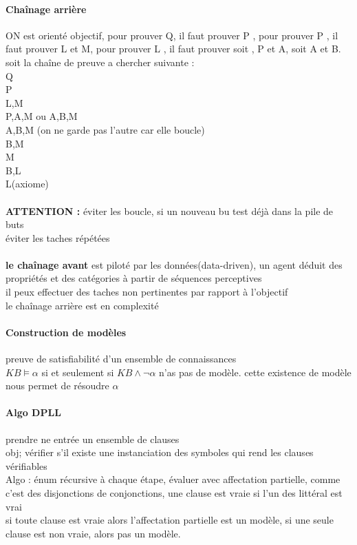 \documentclass{article}
\begin{document}
\paragraph{Chaînage arrière} ON est orienté objectif, pour prouver Q, il faut prouver P , pour prouver P , il faut prouver L et M, pour prouver L , il faut prouver soit , P et A, soit A et B. soit la chaîne de preuve a chercher suivante :\\
Q\\P\\L,M\\P,A,M ou A,B,M\\A,B,M (on ne garde pas l'autre car elle boucle)\\B,M\\M\\B,L\\L(axiome)\\\\ \textbf{ATTENTION : }éviter les boucle, si un nouveau bu test déjà dans la pile de buts \\ éviter les taches répétées\\\\
\textbf{le chaînage avant} est piloté par les données(data-driven), un agent déduit des propriétés et des catégories à partir de séquences perceptives\\il peux effectuer des taches non pertinentes par rapport à l'objectif\\le chaînage arrière est en complexité
\paragraph{Construction de modèles} preuve de satisfiabilité d'un ensemble de connaissances\\$KB\models \alpha$ si et seulement si $KB \wedge \neg \alpha$ n'as pas de modèle. cette existence de modèle nous permet de résoudre $\alpha$\\
\paragraph{Algo DPLL} prendre ne entrée un ensemble de clauses\\obj;  vérifier s'il existe une instanciation des symboles qui rend les clauses vérifiables\\Algo : énum récursive à chaque étape, évaluer avec affectation partielle, comme c'est des disjonctions de conjonctions, une clause est vraie si l'un des littéral est vrai\\si toute clause est vraie alors l'affectation partielle est un modèle, si une seule clause est non vraie, alors pas un modèle.
\end{document}
